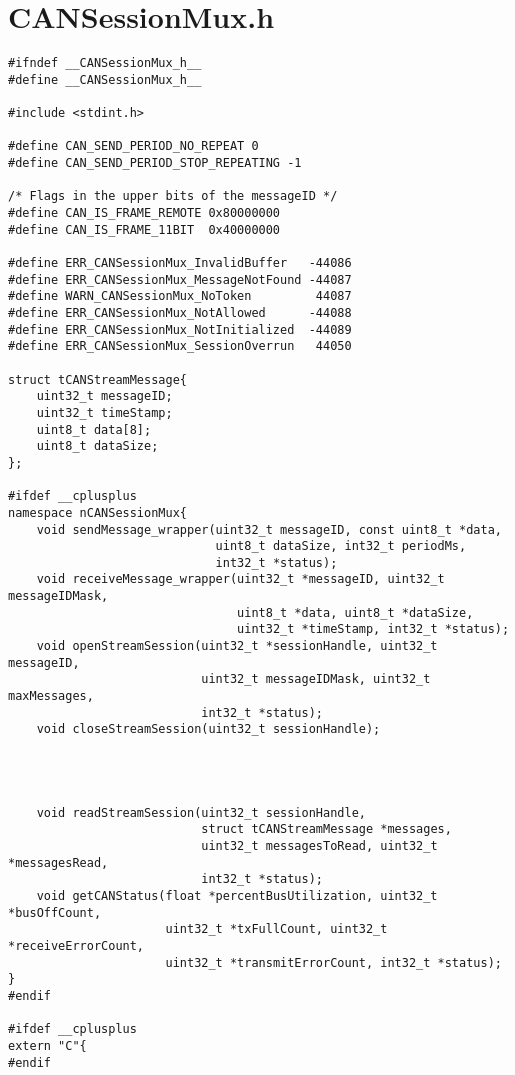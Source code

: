 \documentclass[12pt]{article}
\begin{document}
\section{CANSessionMux.h}
\label{app:cansessionmux}
\begin{verbatim}
#ifndef __CANSessionMux_h__
#define __CANSessionMux_h__

#include <stdint.h>

#define CAN_SEND_PERIOD_NO_REPEAT 0
#define CAN_SEND_PERIOD_STOP_REPEATING -1

/* Flags in the upper bits of the messageID */
#define CAN_IS_FRAME_REMOTE 0x80000000
#define CAN_IS_FRAME_11BIT  0x40000000

#define ERR_CANSessionMux_InvalidBuffer   -44086
#define ERR_CANSessionMux_MessageNotFound -44087
#define WARN_CANSessionMux_NoToken         44087
#define ERR_CANSessionMux_NotAllowed      -44088
#define ERR_CANSessionMux_NotInitialized  -44089
#define ERR_CANSessionMux_SessionOverrun   44050

struct tCANStreamMessage{
    uint32_t messageID;
    uint32_t timeStamp;
    uint8_t data[8];
    uint8_t dataSize;
};

#ifdef __cplusplus
namespace nCANSessionMux{
    void sendMessage_wrapper(uint32_t messageID, const uint8_t *data, 
                             uint8_t dataSize, int32_t periodMs, 
                             int32_t *status);
    void receiveMessage_wrapper(uint32_t *messageID, uint32_t messageIDMask, 
                                uint8_t *data, uint8_t *dataSize, 
                                uint32_t *timeStamp, int32_t *status);
    void openStreamSession(uint32_t *sessionHandle, uint32_t messageID, 
                           uint32_t messageIDMask, uint32_t maxMessages, 
                           int32_t *status);
    void closeStreamSession(uint32_t sessionHandle);
    
    
    
    
    void readStreamSession(uint32_t sessionHandle, 
                           struct tCANStreamMessage *messages, 
                           uint32_t messagesToRead, uint32_t *messagesRead, 
                           int32_t *status);
    void getCANStatus(float *percentBusUtilization, uint32_t *busOffCount, 
                      uint32_t *txFullCount, uint32_t *receiveErrorCount, 
                      uint32_t *transmitErrorCount, int32_t *status);
}
#endif

#ifdef __cplusplus
extern "C"{
#endif


\end{verbatim}
\end{document}
